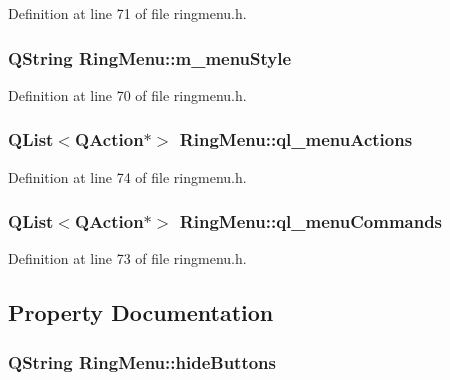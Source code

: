 Definition at line 71 of file ringmenu.h.

\hypertarget{classRingMenu_a44e8981a662fcf261033a1b81e8c2c17}{
\subsubsection[{m\_\-menuStyle}]{\setlength{\rightskip}{0pt plus 5cm}QString {\bf RingMenu::m\_\-menuStyle}}}
\label{classRingMenu_a44e8981a662fcf261033a1b81e8c2c17}


Definition at line 70 of file ringmenu.h.

\hypertarget{classRingMenu_a5f21339751f39c89451aab407339bbb2}{
\subsubsection[{ql\_\-menuActions}]{\setlength{\rightskip}{0pt plus 5cm}QList$<$QAction$\ast$$>$ {\bf RingMenu::ql\_\-menuActions}}}
\label{classRingMenu_a5f21339751f39c89451aab407339bbb2}


Definition at line 74 of file ringmenu.h.

\hypertarget{classRingMenu_a019bd2cb1e166b982396829515e7eb81}{
\subsubsection[{ql\_\-menuCommands}]{\setlength{\rightskip}{0pt plus 5cm}QList$<$QAction$\ast$$>$ {\bf RingMenu::ql\_\-menuCommands}}}
\label{classRingMenu_a019bd2cb1e166b982396829515e7eb81}


Definition at line 73 of file ringmenu.h.



\subsection{Property Documentation}
\hypertarget{classRingMenu_ab945829d0a36844d2be8249414f587bd}{
\subsubsection[{hideButtons}]{\setlength{\rightskip}{0pt plus 5cm}QString RingMenu::hideButtons}}
\label{classRingMenu_ab945829d0a36844d2be8249414f587bd}


